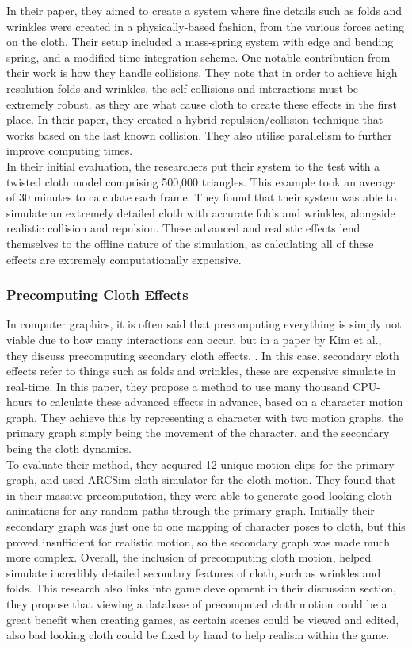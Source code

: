 \documentclass[12pt,a4paper]{article}
\begin{document}
In their paper, they aimed to create a system where fine details such as folds and wrinkles were created in a physically-based fashion, from the various forces acting on the cloth. Their setup included a mass-spring system with edge and bending spring, and a modified time integration scheme. One notable contribution from their work is how they handle collisions. They note that in order to achieve high resolution folds and wrinkles, the self collisions and interactions must be extremely robust, as they are what cause cloth to create these effects in the first place. In their paper, they created a hybrid repulsion/collision technique that works based on the last known collision. They also utilise parallelism to further improve computing times.\\
In their initial evaluation, the researchers put their system to the test with a twisted cloth model comprising 500,000 triangles.  This example took an average of 30 minutes to calculate each frame. They found that their system was able to simulate an extremely detailed cloth with accurate folds and wrinkles, alongside realistic collision and repulsion. These advanced and realistic effects lend themselves to the offline nature of the simulation, as calculating all of these effects are extremely computationally expensive.

\subsubsection{Precomputing Cloth Effects}
In computer graphics, it is often said that precomputing everything is simply not viable due to how many interactions can occur, but in a paper by Kim et al., they discuss precomputing secondary cloth effects. \cite{kim2013near}. In this case, secondary cloth effects refer to things such as folds and wrinkles, these are expensive simulate in real-time. In this paper, they propose a method to use many thousand CPU-hours to calculate these advanced effects in advance, based on a character motion graph. They achieve this by representing a character with two motion graphs, the primary graph simply being the movement of the character, and the secondary being the cloth dynamics. \\

To evaluate their method, they acquired 12 unique motion clips for the primary graph, and used ARCSim cloth simulator for the cloth motion. They found that in their massive precomputation, they were able to generate good looking cloth animations for any random paths through the primary graph. Initially their secondary graph was just one to one mapping of character poses to cloth, but this proved insufficient for realistic motion, so the secondary graph was made much more complex. 
Overall, the inclusion of precomputing cloth motion, helped simulate incredibly detailed secondary features of cloth, such as wrinkles and folds. This research also links into game development in their discussion section, they propose that viewing a database of precomputed cloth motion could be a great benefit when creating games, as certain scenes could be viewed and edited, also bad looking cloth could be fixed by hand to help realism within the game. \\
\end{document}

